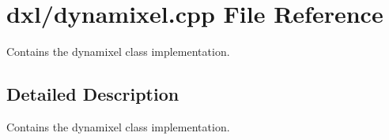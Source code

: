 \hypertarget{a00014}{}\section{dxl/dynamixel.cpp File Reference}
\label{a00014}


Contains the dynamixel class implementation.  




\subsection{Detailed Description}
Contains the dynamixel class implementation. 

